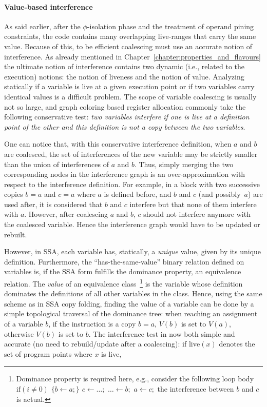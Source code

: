 \paragraph{Value-based interference}
\label{par:alternative_ssa_destruction:value}
As said earlier, after the $\phi$-isolation phase and the treatment of operand pining constraints, the code contains many overlapping live-ranges that carry the same value. 
Because of this, to be efficient coalescing must use an accurate notion of interference. 
As already mentioned in Chapter~\ref{chapter:properties_and_flavours} the ultimate notion of interference contains two dynamic (i.e., related to the execution) notions: 
the notion of liveness and the notion of value. 
Analyzing statically if a variable is live at a given execution point or if two variables carry identical values is a difficult problem. 
The scope of variable coalescing is usually not so large, and graph coloring based register allocation commonly take the following conservative test: 
\emph{two variables interfere if one is live at a definition point of the other and this definition is not a copy between the two variables}.

One can notice that, with this conservative interference definition, when $a$ and $b$ are coalesced, the set of interferences of the new variable may be strictly smaller than the union of interferences of $a$ and $b$. 
Thus, simply merging the two corresponding nodes in the interference graph is an over-approximation with respect to the interference definition. 
For example, in a block with two successive copies $b=a$ and $c=a$ where $a$ is defined before, and $b$ and $c$ (and possibly~$a$) are used after, it is considered that $b$ and $c$ interfere but that none of them interfere with $a$. 
However, after coalescing $a$ and $b$, $c$ should not interfere anymore with the coalesced variable. 
Hence the interference graph would have to be updated or rebuilt.


However, in SSA, each variable has, statically, a \emph{unique} value, given by its unique definition. 
Furthermore, the ``has-the-same-value'' binary relation defined on variables is, if the SSA form fulfills the dominance property, an equivalence relation. 
The \emph{value} of an equivalence class~\footnote{Dominance property is required here, e.g., consider the following loop body $\textrm{if}(i\neq 0)$ $\{b\gets a;\}$ $c\gets\dots;$ $\dots\gets b;$ $a\gets c;$ the interference between $b$ and $c$ is actual.} 
is the variable whose definition dominates the definitions of all other variables in the class. 
Hence, using the same scheme as in SSA copy folding, finding the value of a variable can be done by a simple topological traversal of the dominance tree: 
when reaching an assignment of a variable $b$, if the instruction is a copy $b=a$, $V(b)$ is set to $V(a)$, otherwise $V(b)$ is set to $b$. 
The interference test in now both simple and accurate (no need to rebuild/update after a coalescing): 
if $\textrm{live}(x)$ denotes the set of program points where $x$ is live,

